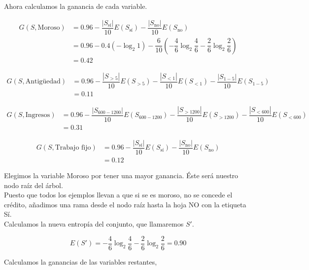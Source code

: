 \begin{ejemplo}
	Ahora calculamos la ganancia de cada variable.
	
	\begin{align*}
	G(S, \text{Moroso}) & = 0.96 - \dfrac{|S_\text{sí}|}{10}E(S_\text{sí}) - \dfrac{|S_\text{no}|}{10}E(S_\text{no}) \\
	                    & = 0.96 - 0.4 \left(-\log_2 1\right) - \dfrac{6}{10} \left( -\dfrac{4}{6} \log_2 \dfrac{4}{6} - \dfrac{2}{6} \log_2 \dfrac{2}{6} \right)\\
	                    & = 0.42
	\end{align*}
	
	\begin{align*}
	G(S, \text{Antigüedad}) & = 0.96 - \dfrac{|S_{>5}|}{10} E(S_{>5}) - \dfrac{|S_{<1}|}{10} E(S_{<1}) - \dfrac{|S_{1-5}|}{10} E(S_{1-5})\\
	                        & = 0.11
	\end{align*}
	
	\begin{align*}
	G(S, \text{Ingresos}) & = 0.96 - \dfrac{|S_{600-1200}|}{10} E(S_{600-1200}) - \dfrac{|S_{>1200}|}{10} E(S_{>1200}) - \dfrac{|S_{<600}|}{10} E(S_{<600})\\
	                      & = 0.31
	\end{align*}
	
	\begin{align*}
	G(S, \text{Trabajo fijo}) & = 0.96 - \dfrac{|S_{\text{sí}}|}{10} E(S_\text{sí}) - \dfrac{|S_{\text{no}}|}{10} E(S_\text{no})\\
	                          & = 0.12 
	\end{align*}
	
	Elegimos la variable Moroso por tener una mayor ganancia. Éste será nuestro nodo raíz del árbol.\\
	
	Puesto que todos los ejemplos llevan a que si se es moroso, no se concede el crédito, añadimos una rama desde el nodo raíz hasta la hoja NO con la etiqueta Sí.\\
	
	Calculamos la nueva entropía del conjunto, que llamaremos $S'$.
	
	\begin{equation*}
	E(S') = -\dfrac{4}{6}\log_2 \dfrac{4}{6} - \dfrac{2}{6} \log_2 \dfrac{2}{6} = 0.90
	\end{equation*}
	
	Calculamos la ganancias de las variables restantes,
	

\end{ejemplo}
